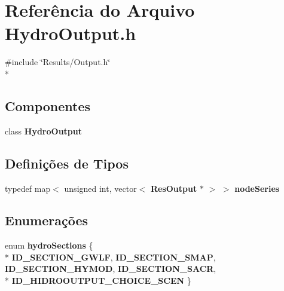 \section{Referência do Arquivo Hydro\+Output.\+h}
\label{_hydro_output_8h}
{\ttfamily \#include \char`\"{}Results/\+Output.\+h\char`\"{}}\\*
\subsection*{Componentes}
\begin{DoxyCompactItemize}
\item 
class {\bf Hydro\+Output}
\end{DoxyCompactItemize}
\subsection*{Definições de Tipos}
\begin{DoxyCompactItemize}
\item 
typedef map$<$ unsigned int, vector$<$ {\bf Res\+Output} $\ast$ $>$ $>$ {\bf node\+Series}
\end{DoxyCompactItemize}
\subsection*{Enumerações}
\begin{DoxyCompactItemize}
\item 
enum {\bf hydro\+Sections} \{ \\*
{\bf I\+D\+\_\+\+S\+E\+C\+T\+I\+O\+N\+\_\+\+G\+W\+LF}, 
{\bf I\+D\+\_\+\+S\+E\+C\+T\+I\+O\+N\+\_\+\+S\+M\+AP}, 
{\bf I\+D\+\_\+\+S\+E\+C\+T\+I\+O\+N\+\_\+\+H\+Y\+M\+OD}, 
{\bf I\+D\+\_\+\+S\+E\+C\+T\+I\+O\+N\+\_\+\+S\+A\+CR}, 
\\*
{\bf I\+D\+\_\+\+H\+I\+D\+R\+O\+O\+U\+T\+P\+U\+T\+\_\+\+C\+H\+O\+I\+C\+E\+\_\+\+S\+C\+EN}
 \}
\end{DoxyCompactItemize}
